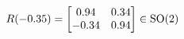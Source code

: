 \documentclass[preview]{standalone}
\begin{document}
\begin{align*}
\special{dvisvgm:raw <g id='unique000'>}R(-0.35) = \begin{bmatrix} 0.94 & 0.34 \\ -0.34 & 0.94 \end{bmatrix} \in \text{SO}(2)\special{dvisvgm:raw </g>}
\end{align*}
\end{document}
